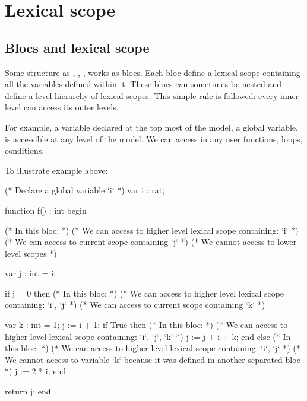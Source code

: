 \section{Lexical scope}\label{section:variable_scope}

\subsection{Blocs and lexical scope}

Some structure as , , ,  works as blocs.
Each bloc define a lexical scope containing all the variables defined within it.
These blocs can sometimes be nested and define a level hierarchy of lexical scopes.
This simple rule is followed: every inner level can access its outer levels.

For example, a variable  declared at the top most of the model, a global variable, is accessible at any level of the model.
We can access  in any user functions, loops, conditions.

\begin{example}
	To illustrate example above:

\begin{IMITATORmodel}
(* Declare a global variable `i` *)
var i : rat;

function f() : int
begin

	(* In this bloc: *)
	(* We can access to higher level lexical scope containing: `i` *)
	(* We can access to current scope containing `j` *)
	(* We cannot access to lower level scopes *)

	var j : int = i;

	if j = 0 then
		(* In this bloc: *)
		(* We can access to higher level lexical scope containing: `i`, `j` *)
		(* We can access to current scope containing `k` *)

		var k : int = 1;
		j := i + 1;
		if True then
			(* In this bloc: *)
			(* We can access to higher level lexical scope containing: `i`, `j`, `k` *)
			j := j + i + k;
		end
	else
		(* In this bloc: *)
		(* We can access to higher level lexical scope containing: `i`, `j` *)
		(* We cannot access to variable `k` because it was defined in another separated bloc *)
		j := 2 * i;
	end

	return j;
end
\end{IMITATORmodel}
\end{example}

